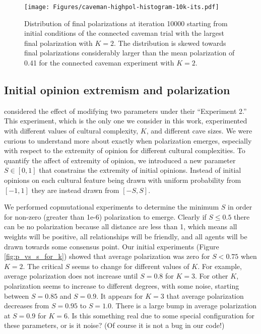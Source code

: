 \documentclass[11pt,letterpaper]{article}
\begin{document}
\begin{figure}[h!]
  \centering
    \texttt{[image: Figures/caveman-highpol-histogram-10k-its.pdf]}
  \caption{Distribution of final polarizations at iteration 10000
  starting from initial conditions
  of the connected caveman trial with the largest final polarization with $K=2$.
  The distribution is skewed towards final polarizations considerably larger
  than the mean polarization of 0.41 for the connected caveman experiment
  with $K=2$. 
  }
  \label{fig:highpol-histogram}
\end{figure}



\subsection{Initial opinion extremism and polarization}

 considered the effect of modifying two parameters under their
``Experiment 2.'' This experiment, which is the only one we consider in this
work, experimented with different values of cultural complexity, $K$, and 
different cave sizes. We were curious to understand more about exactly when
polarization emerges, especially with respect to the extremity of opinion
for different cultural complexities. To quantify the affect of extremity of
opinion, we introduced a new parameter $S \in [0, 1]$ that constrains the
extremity of initial opinions. Instead of initial opinions on each
cultural feature being drawn with uniform probability from $[-1, 1]$ they are
instead drawn from $[-S, S]$. 

We performed copmutational experiments to determine the minimum $S$ 
in order for non-zero (greater than 1e-6) polarization to emerge. Clearly if 
$S\leq0.5$ there can be no polarization because all distance are less than 1,
which means all weights will be positive, all
relationships will be friendly, and all agents will be drawn towards some 
consensus point. Our initial experiments (Figure \ref{fig:p_vs_s_for_k})
showed that average polarization was zero for $S < 0.75$ when $K=2$. 
The critical $S$ seems to change for different values of $K$. For example,
average polarization does not increase until $S=0.8$ for $K=3$. For other $K$,
polarization seems to increase to different degrees, with some noise, starting
between $S=0.85$ and $S=0.9$. It appears for $K=3$ that average polarization
decreases from $S=0.95$ to $S=1.0$. There is a large bump in average 
polarization at $S=0.9$ for $K=6$. Is this something real due to some special
configuration for these parameters, or is it noise? (Of course it is not a bug
in our code!)
\end{document}
